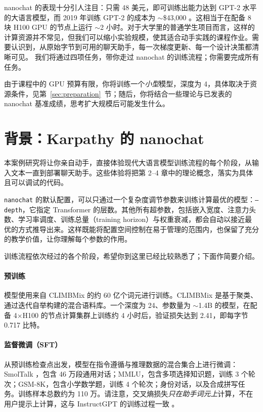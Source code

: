 nanochat 的表现十分引人注目：只需 48 美元，即可训练出能力达到 GPT-2 水平的大语言模型，而 2019 年训练 GPT-2 的成本为 $\sim$\$43,000 \citep{radford2019language}。这相当于在配备 8 块 H100 GPU 的节点上运行 $\sim$2 小时。对于大学里的普通学生项目而言，这样的计算资源并不常见，但我们可以缩小实验规模，使其适合动手实践的课程作业。需要认识到，从原始字节到可用的聊天助手，每一次梯度更新、每一个设计决策都清晰可见。
我们将通过四项任务，带你走过 nanochat 的训练流程；你需要完成所有任务。

由于课程中的 GPU 预算有限，你将训练一个\emph{小型}模型，深度为 4，具体取决于资源条件，见第~\ref{sec:preparation}~节；随后，你将结合一些理论与已发表的 nanochat 基准成绩，思考扩大规模后可能发生什么。

\label{sec:learning-goals}

\section{背景：Karpathy 的 nanochat}
\label{sec:background}
本案例研究将让你亲自动手，直接体验现代大语言模型训练流程的每个阶段，从输入文本一直到部署聊天助手。这些体验将把第 2--4 章中的理论概念，落实为具体且可以调试的代码。

\texttt{nanochat} 的默认配置，可以只通过一个复杂度调节参数来训练计算最优的模型：\texttt{--depth}，它指定 Transformer 的层数。其他所有超参数，包括嵌入宽度、注意力头数、学习率调度、训练总量（training horizon）与权重衰减，都会自动以接近最优的方式推导出来。这样既能将配置空间控制在易于管理的范围内，也保留了充分的教学价值，让你理解每个参数的作用。

训练流程依次经过的各个阶段，希望你到这里已经比较熟悉了；下面作简要介绍。

\paragraph{预训练} 模型使用来自 CLIMBMix \citep{diao2026nemotron} 的约 60 亿个词元进行训练。CLIMBMix 是基于聚类、通过迭代自举构建的混合语料库。一个深度为 24、参数量为 $\sim $1.4B 的模型，在配备 4$\times$H100 的节点计算集群上训练约 4 小时后，验证损失达到 2.41，即每字节 0.717 比特。

\paragraph{监督微调（SFT）} 从预训练检查点出发，模型在指令遵循与推理数据的混合集合上进行微调：SmolTalk \citep{benallal2024smoltalk}，包含 46 万段通用对话；MMLU，包含多项选择知识题，训练 3 个轮次；GSM-8K，包含小学数学题，训练 4 个轮次；身份对话，以及合成拼写任务。训练样本总数约为 110 万。请注意，交叉熵损失\emph{只在助手词元上}计算，不在用户提示上计算，这与 InstructGPT 的训练过程一致 \citep{ouyang2022training}。

